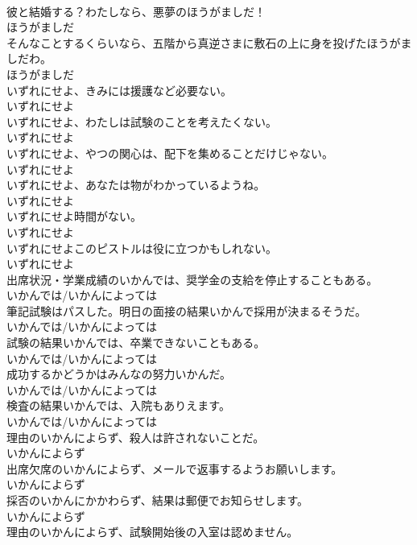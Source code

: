 \documentclass[8pt]{extreport}
\begin{document}
\begin{CJK}{UTF8}{min}
\\	彼と結婚する？わたしなら、悪夢のほうがましだ！	
\\	ほうがましだ
\\	そんなことするくらいなら、五階から真逆さまに敷石の上に身を投げたほうがましだわ。	
\\	ほうがましだ
\\	いずれにせよ、きみには援護など必要ない。	
\\	いずれにせよ
\\	いずれにせよ、わたしは試験のことを考えたくない。	
\\	いずれにせよ
\\	いずれにせよ、やつの関心は、配下を集めることだけじゃない。	
\\	いずれにせよ
\\	いずれにせよ、あなたは物がわかっているようね。	
\\	いずれにせよ
\\	いずれにせよ時間がない。	
\\	いずれにせよ
\\	いずれにせよこのピストルは役に立つかもしれない。	
\\	いずれにせよ
\\	出席状況・学業成績のいかんでは、奨学金の支給を停止することもある。	
\\	いかんでは/いかんによっては
\\	筆記試験はパスした。明日の面接の結果いかんで採用が決まるそうだ。	
\\	いかんでは/いかんによっては
\\	試験の結果いかんでは、卒業できないこともある。	
\\	いかんでは/いかんによっては
\\	成功するかどうかはみんなの努力いかんだ。	
\\	いかんでは/いかんによっては
\\	検査の結果いかんでは、入院もありえます。	
\\	いかんでは/いかんによっては
\\	理由のいかんによらず、殺人は許されないことだ。	
\\	いかんによらず
\\	出席欠席のいかんによらず、メールで返事するようお願いします。	
\\	いかんによらず
\\	採否のいかんにかかわらず、結果は郵便でお知らせします。	
\\	いかんによらず
\\	理由のいかんによらず、試験開始後の入室は認めません。	

\end{CJK}
\end{document}
